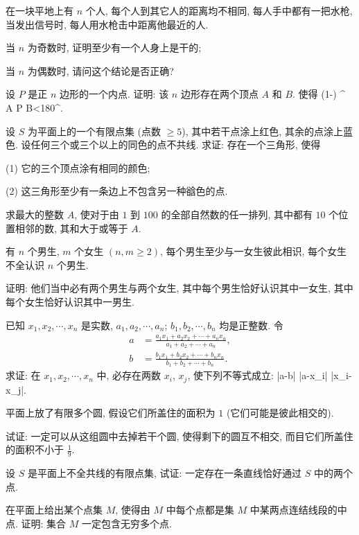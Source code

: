 在一块平地上有 $n$ 个人, 每个人到其它人的距离均不相同, 每人手中都有一把水枪, 当发出信号时, 每人用水枪击中距离他最近的人.

当 $n$ 为奇数时, 证明至少有一个人身上是干的;

当 $n$ 为偶数时, 请问这个结论是否正确?
\eq

设 $P$ 是正 $n$ 边形的一个内点. 证明: 该 $n$ 边形存在两个顶点 $A$ 和 $B$. 使得
\bee
\left(1-\right) ^{\circ} \le \angle A P B<180^{\circ}.
\eee
\eq

设 $S$ 为平面上的一个有限点集 (点数 $\ge 5$), 其中若干点涂上红色, 其余的点涂上蓝色.
设任何三个或三个以上的同色的点不共线.
求证: 存在一个三角形, 使得

(1) 它的三个顶点涂有相同的颜色;

(2) 这三角形至少有一条边上不包含另一种谽色的点.
\eq

求最大的整数 $A$, 使对于由 $1$ 到 $100$ 的全部自然数的任一排列, 其中都有 $10$ 个位置相邻的数, 其和大于或等于 $A$.
\eq

\bq{}{}
有 $n$ 个男生, $m$ 个女生 $(n, m \ge 2)$, 每个男生至少与一女生彼此相识, 每个女生不全认识 $n$ 个男生.

证明: 他们当中必有两个男生与两个女生, 其中每个男生恰好认识其中一女生, 其中每个女生恰好认识其中一男生.
\eq

\bq{}{}
已知 $x_1, x_2, \cdots, x_n$ 是实数, $a_1, a_2, \cdots, a_n$; $b_1, b_2, \cdots, b_n$ 均是正整数. 令
\begin{align*}
	a & = \frac{a_1 x_1+a_2 x_2+\cdots+a_n x_n}{a_1+a_2+\cdots+a_n}, \\
	b & = \frac{b_1 x_1+b_2 x_2+\cdots+b_n x_n}{b_1+b_2+\cdots+b_n}.
\end{align*}
求证: 在 $x_1, x_2, \cdots, x_{n}$ 中, 必存在两数 $x_i$, $x_j$, 使下列不等式成立:
\bee
|a-b| \le \left|a-x_i\right| \le \left|x_i-x_j\right|.
\eee
\eq

\bq{}{}
平面上放了有限多个圆, 假设它们所盖住的面积为 $1$ (它们可能是彼此相交的).

试证: 一定可以从这组圆中去掉若干个圆, 使得剩下的圆互不相交, 而目它们所盖住的面积不小于 $\frac{1}{9}$.
\eq

设 $S$ 是平面上不全共线的有限点集, 试证: 一定存在一条直线恰好通过 $S$ 中的两个点. 
\eq

\bq{}{}
在平面上给出某个点集 $M$, 使得由 $M$ 中每个点都是集 $M$ 中某两点连结线段的中点. 证明: 集合 $M$ 一定包含无穷多个点.
\eq

